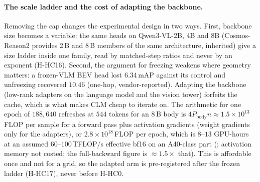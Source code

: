 \paragraph{The scale ladder and the cost of adapting the backbone.}
Removing the cap changes the experimental design in two ways. First, backbone size becomes a variable: the same heads on Qwen3-VL-2B, 4B and 8B (Cosmos-Reason2 provides 2\,B and 8\,B members of the same architecture, inherited) give a size ladder inside one family, read by matched-step ratios and never by an exponent (H-HC16). Second, the argument for freezing weakens where geometry matters: a frozen-VLM BEV head lost $6.34$\,mAP against its control and unfreezing recovered $10.46$\evP{} (one-hop, vendor-reported). Adapting the backbone (low-rank adapters on the language model and the vision tower) forfeits the cache, which is what makes CLM cheap to iterate on. The arithmetic for one epoch of $188{,}640$ refreshes at $544$ tokens for an 8\,B body is $4P_{\text{body}}n\approx1.5\times10^{13}$\,FLOP per sample for a forward pass plus activation gradients (weight gradients only for the adapters), or $2.8\times10^{18}$\,FLOP per epoch, which is $8$--$13$ GPU-hours at an assumed $60$--$100$\,TFLOP/s effective bf16 on an A40-class part (\evE; activation memory not costed; the full-backward figure is $\approx1.5\times$ that). This is affordable once and not for a grid, so the adapted arm is pre-registered after the frozen ladder (H-HC17), never before H-HC0.

